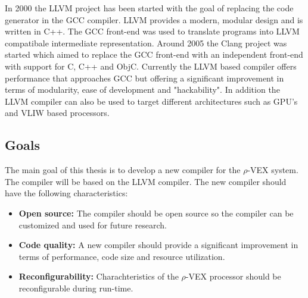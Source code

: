 In 2000 the LLVM project has been started with the goal of replacing the code generator in the GCC compiler. LLVM provides a modern, modular design and is written in C++. The GCC front-end was used to translate programs into LLVM compatibale intermediate representation. Around 2005 the Clang project was started which aimed to replace the GCC front-end with an independent front-end with support for C, C++ and ObjC. Currently the LLVM based compiler offers performance that approaches GCC but offering a significant improvement in terms of modularity, ease of development and "hackability". In addition the LLVM compiler can also be used to target different architectures such as GPU's and VLIW based processors.

\subsection{Goals}
The main goal of this thesis is to develop a new compiler for the $\rho$-VEX system. The compiler will be based on the LLVM compiler. The new compiler should have the following characteristics:

\begin{itemize}
	\item \textbf{Open source:} The compiler should be open source so the compiler can be customized and used for future research.
	\item \textbf{Code quality:} A new compiler should provide a significant improvement in terms of performance, code size and resource utilization.
	\item \textbf{Reconfigurability:} Charachteristics of the $\rho$-VEX processor should be reconfigurable during run-time.
\end{itemize}

